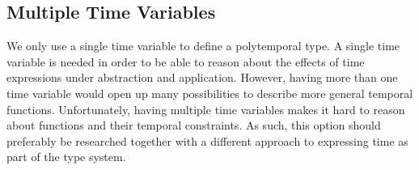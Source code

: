 \subsection{Multiple Time Variables}
We only use a single time variable to define a polytemporal type.
A single time variable is needed in order to be able to reason about the effects of time expressions under abstraction and application.
However, having more than one time variable would open up many possibilities to describe more general temporal functions.
Unfortunately, having multiple time variables makes it hard to reason about functions and their temporal constraints.
As such, this option should preferably be researched together with a different approach to expressing time as part of the type system.


